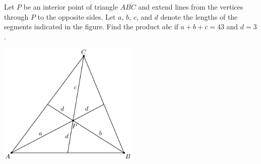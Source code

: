 Let $P$ be an interior point of triangle $ABC$ and extend lines from the vertices through $P$ to the opposite sides.  Let $a$, $b$, $c$, and $d$ denote the lengths of the segments indicated in the figure.  Find the product $abc$ if $a + b + c = 43$ and $d = 3$.

\begin{center}
\includegraphics[width = 67.0mm]{img/fig0.png}
\end{center}